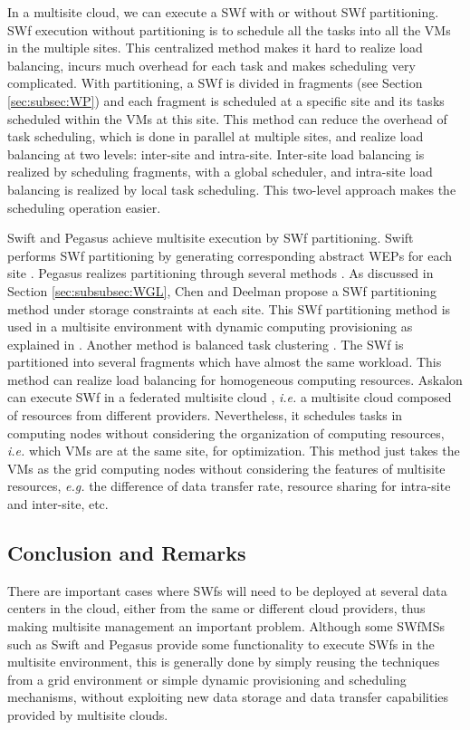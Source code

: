 In a multisite cloud, we can execute a SWf with or without SWf partitioning.
SWf execution without partitioning is to schedule all the tasks into all the VMs in the multiple sites. This centralized method makes it hard to realize load balancing, incurs
much overhead for each task and makes scheduling very complicated.
With partitioning, a SWf is divided in fragments
(see Section \ref{sec:subsec:WP}) and each fragment is scheduled at a specific
site and its tasks scheduled within the VMs at this site. 
This method can reduce the overhead of task scheduling, which is done
in parallel at multiple sites, and realize load balancing at two
levels: inter-site and intra-site.
Inter-site load balancing is realized by scheduling fragments,
with a global scheduler,
and intra-site load balancing is realized by local task scheduling. 
This two-level approach makes the scheduling operation
easier. 

Swift and Pegasus achieve multisite execution by SWf partitioning. Swift performs SWf partitioning by generating
corresponding abstract WEPs for each site \cite{Zhao2007}.
Pegasus realizes partitioning through several methods
\cite{Chen2012a, Chen2013}. As discussed in Section \ref{sec:subsubsec:WGL}, Chen and Deelman
\cite{Chen2012a} propose a SWf partitioning method under storage
constraints at each site. This SWf partitioning method is used in a multisite environment with dynamic computing provisioning as explained in \cite{Chen2012}.
Another method is balanced task clustering \cite{Chen2013}.
The SWf is partitioned into several fragments which have almost the same workload.
This method can realize load balancing for homogeneous computing
resources. Askalon can execute SWf in
a federated multisite cloud \cite{Ostermann2009a}, \textit{i.e.} a multisite cloud composed of resources from different providers.
Nevertheless, it schedules tasks in computing nodes 
without considering the organization of computing resources,
\textit{i.e.} which VMs are at the same site, for optimization. 
This method just takes the VMs as the grid computing nodes without considering the features of multisite resources, \textit{e.g.}
the difference of data transfer rate, resource sharing for intra-site and inter-site, etc.

\subsection{Conclusion and Remarks}

There are important cases where SWfs will need to be
deployed at several data centers in the cloud, either from the same or
different cloud providers, thus making multisite management an important problem.
Although some SWfMSs such as Swift and Pegasus provide some
functionality to execute SWfs in the multisite environment, this is generally done
by simply reusing the techniques from a grid environment or simple dynamic provisioning and scheduling mechanisms, without
exploiting new data storage and data transfer capabilities provided by
multisite clouds. 

